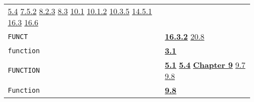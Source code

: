 \documentclass[a4paper]{scrbook}
\begin{document}
\begin{longtable}[]{@{}ll@{}}
\begin{minipage}[t]{0.70\columnwidth}
\href{05-simple-functions.md\#54-defining-functions-function-and-define-1}{5.4}
\href{07-structured-objects.md\#752-quote-1}{7.5.2} \href{08-truth.md\#823-boolean-operators-1}{8.2.3}
\href{08-truth.md\#83-cond-1}{8.3} \href{10-looping.md\#101-prog-and-repeat-1}{10.1}
\href{10-looping.md\#1012-again-and-return-in-prog-and-repeat-1}{10.1.2} \href{10-looping.md\#1035-stackform}{10.3.5}
\href{14-data-type-declarations.md\#1451-gdecl-and-manifest}{14.5.1}
\href{16-errors-frames-etc.md\#163-frame-the-type}{16.3} \href{16-errors-frames-etc.md\#166-unwind}{16.6}\strut
\end{minipage}\tabularnewline
\begin{minipage}[t]{0.24\columnwidth}\raggedright\strut
\texttt{FUNCT}\strut
\end{minipage} & \begin{minipage}[t]{0.70\columnwidth}\raggedright\strut
\textbf{\href{16-errors-frames-etc.md\#1632-funct}{16.3.2}}
\href{20-coroutines.md\#208-sneakiness-with-processes}{20.8}\strut
\end{minipage}\tabularnewline
\begin{minipage}[t]{0.24\columnwidth}\raggedright\strut
\texttt{function}\strut
\end{minipage} & \begin{minipage}[t]{0.70\columnwidth}\raggedright\strut
\textbf{\href{03-built-in-functions.md\#31-representation-1}{3.1}}\strut
\end{minipage}\tabularnewline
\begin{minipage}[t]{0.24\columnwidth}\raggedright\strut
\texttt{FUNCTION}\strut
\end{minipage} & \begin{minipage}[t]{0.70\columnwidth}\raggedright\strut
\textbf{\href{05-simple-functions.md\#51-general-1}{5.1}}
\textbf{\href{05-simple-functions.md\#54-defining-functions-function-and-define-1}{5.4}}
\textbf{\href{09-functions.md\#chapter-9-functions}{Chapter 9}} \href{09-functions.md\#97-eval-and-bind}{9.7}
\href{09-functions.md\#98-activation-name-act-again-and-return-1}{9.8}\strut
\end{minipage}\tabularnewline
\begin{minipage}[t]{0.24\columnwidth}\raggedright\strut
\texttt{Function}\strut
\end{minipage} & \begin{minipage}[t]{0.70\columnwidth}\raggedright\strut
\textbf{\href{09-functions.md\#98-activation-name-act-again-and-return-1}{9.8}}\strut
\end{minipage}\tabularnewline

\end{longtable}
\end{document}
